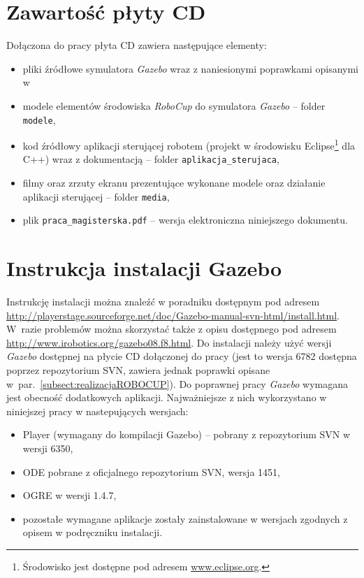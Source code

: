 \appendix
\chapter[Zawartość płyty CD ]{Zawartość płyty CD}
Dołączona do pracy płyta CD zawiera następujące elementy:
\begin{itemize}
\item pliki źródłowe symulatora \textit{Gazebo} wraz z naniesionymi poprawkami opisanymi w %
\item modele elementów środowiska \textit{RoboCup} do symulatora \textit{Gazebo} -- folder \texttt{modele},
\item kod źródłowy aplikacji sterującej robotem (projekt w środowisku \mbox{Eclipse}\footnote{Środowisko jest dostępne pod adresem \url{www.eclipse.org}.} dla C++) wraz z dokumentacją -- folder \texttt{aplikacja\_sterujaca},
\item filmy oraz zrzuty ekranu prezentujące wykonane modele oraz działanie aplikacji sterującej -- folder \texttt{media},
\item plik \texttt{praca\_magisterska.pdf} -- wersja elektroniczna niniejszego dokumentu.
\end{itemize}


\chapter[Instrukcja instalacji Gazebo]{Instrukcja instalacji Gazebo}
Instrukcję instalacji można znaleźć w poradniku dostępnym pod adresem \url{http://playerstage.sourceforge.net/doc/Gazebo-manual-svn-html/install.html}. \newline
W~razie problemów można skorzystać także z opisu dostępnego pod adresem \newline \url{http://www.irobotics.org/gazebo08.f8.html}. Do instalacji należy użyć wersji \textit{Gazebo} dostępnej na płycie CD dołączonej do pracy (jest to wersja 6782 dostępna poprzez repozytorium SVN, zawiera jednak poprawki opisane w~par.~\ref{subsect:realizacjaROBOCUP}). Do poprawnej pracy \textit{Gazebo} wymagana jest obecność dodatkowych aplikacji. Najważniejsze z nich wykorzystano w niniejszej pracy w nastepujących wersjach:
\begin{itemize}
 \item Player (wymagany do kompilacji Gazebo) -- pobrany z repozytorium SVN w wersji 6350,
 \item ODE pobrane z oficjalnego repozytorium SVN, wersja 1451,
 \item OGRE w wersji 1.4.7,
 \item pozostałe wymagane aplikacje zostały zainstalowane w wersjach zgodnych z opisem w podręczniku instalacji.
\end{itemize}


%


